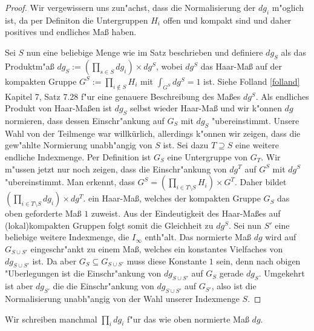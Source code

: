 		\begin{proof}
			Wir vergewissern uns zun"achst, dass die Normalisierung der $dg_i$ m"oglich ist, da per Definiton die Untergruppen $H_i$ offen und kompakt sind und daher positives und endliches Maß haben.
			
			Sei $S$ nun eine beliebige Menge wie im Satz beschrieben und definiere $dg_S$ als das Produktm"aß $dg_S :=\left(\prod_{s \in S}dg_i\right) \times dg^S$, wobei $dg^S$ das Haar-Maß auf der kompakten Gruppe $G^S:=\prod_{i \notin S} H_i$ mit $\int_{G^S} dg^S = 1$ ist. 
			Siehe Folland \ref{folland} Kapitel 7, Satz 7.28 f"ur eine genauere Beschreibung des Maßes $dg^S$. 
			Als endliches Produkt von Haar-Maßen ist $dg_S$ selbst wieder Haar-Maß und wir k"onnen $dg$ normieren, dass dessen Einschr"ankung auf $G_S$ mit $dg_S$ "ubereinstimmt.
			Unsere Wahl von der Teilmenge war willkürlich, allerdings k"onnen wir zeigen, dass die gew"ahlte Normierung unabh"angig von $S$ ist. Sei dazu $T\supseteq S$ eine weitere endliche Indexmenge. 
			Per Definition ist $G_S$ eine Untergruppe von $G_T$. 
			Wir m"ussen jetzt nur noch zeigen, dass die Einschr"ankung von $dg^T$ auf $G^S$ mit $dg^S$ "ubereinstimmt.
			Man erkennt, dass $G^S = \left(\prod_{i \in T \setminus S} H_i\right) \times G^T$. Daher bildet $\left(\prod_{i \in T \setminus S} dg_i\right) \times dg^T$.
			ein Haar-Maß, welches der kompakten Gruppe $G_S$ das oben geforderte Maß $1$ zuweist. Aus der Eindeutigkeit des Haar-Maßes auf (lokal)kompakten Gruppen folgt somit die Gleichheit zu $dg^S$.
			Sei nun $S'$ eine beliebige weitere Indexmenge, die $I_\infty$ enth"alt. Das normierte Maß $dg$ wird auf $G_{S\cup S'}$ eingeschr"ankt zu einem Maß, welches ein konstantes Vielfaches von $dg_{S\cup S'}$ ist. 
			Da aber $G_S \subseteq G_{S\cup S'}$ muss diese Konstante $1$ sein, denn nach obigen "Uberlegungen ist die Einschr"ankung von $dg_{S\cup S'}$ auf $G_S$ gerade $dg_{S}$.
			Umgekehrt ist aber $dg_{S'}$ die die Einschr"ankung von $dg_{S\cup S'}$ auf $G_{S'}$, also ist die Normalisierung unabh"angig von der Wahl unserer Indexmenge $S$.
		\end{proof}
		Wir schreiben manchmal $\prod_{i} dg_i$ f"ur das wie oben normierte Maß $dg$.
		
